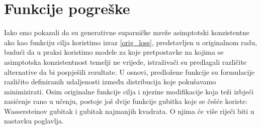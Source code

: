 \section{Funkcije pogreške}
Iako smo pokazali da su generativne suparničke mreže asimptotski konzistentne ako kao funkciju cilja koristimo izraz \ref{orig_loss}, predstavljen u originalnom radu, budući da u praksi koristimo modele za koje pretpostavke na kojima se asimptotska konzistentnost temelji ne vrijede, istraživači su predlagali različite alternative da bi pospješili rezultate. U osnovi, predložene funkcije su formulacije različito definiranih udaljenosti između distribucija koje pokušavamo minimizirati. Osim originalne funkcije cilja i njezine modifikacije koja teži izbjeći zasićenje rano u učenju, postoje još dvije funkcije gubitka koje se češće koriste: Wassersteinov gubitak i gubitak najmanjih kvadrata. O njima će više riječi biti u nastavku poglavlja.

